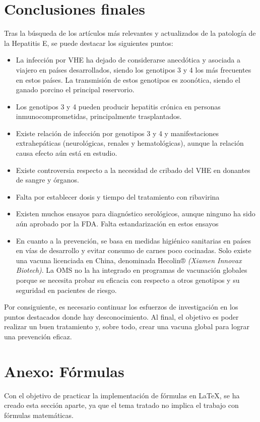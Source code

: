\documentclass[11 pt]{article}
\begin{document}
\section{Conclusiones finales}
Tras la búsqueda de los artículos más relevantes y actualizados de la patología de la Hepatitis E, se puede destacar los siguientes puntos:
\begin{itemize}
	\item 
	La infección por VHE ha dejado de considerarse anecdótica y asociada a viajero en países desarrollados, siendo los genotipos 3 y 4 los más frecuentes en estos países. La transmisión de estos genotipos es zoonótica, siendo el ganado porcino el principal reservorio. 
	\item 
	Los genotipos 3 y 4 pueden producir hepatitis crónica en personas inmunocomprometidas, principalmente trasplantados.
	\item 
	Existe relación de infección por genotipos 3 y 4 y manifestaciones extrahepáticas (neurológicas, renales y hematológicas), aunque la relación causa efecto aún está en estudio.
	\item 
	Existe controversia respecto a la necesidad de cribado del VHE en donantes de sangre y órganos.
	\item 
	Falta por establecer dosis y tiempo del tratamiento con ribavirina
	\item 
	Existen muchos ensayos para diagnóstico serológicos, aunque ninguno ha sido aún aprobado por la FDA. Falta estandarización en estos ensayos
	\item 
	En cuanto a la prevención, se basa en medidas higiénico sanitarias en países en vías de desarrollo y evitar consumo de carnes poco cocinadas. Solo existe una vacuna licenciada en China, denominada Hecolin® {\em (Xiamen Innovax Biotech)}. La OMS no la ha integrado en programas de vacunación globales porque se necesita probar su eficacia con respecto a otros genotipos y su seguridad en pacientes de riesgo.
\end{itemize}
Por consiguiente, es necesario continuar los esfuerzos de investigación en los puntos destacados donde hay desconocimiento. Al final, el objetivo es poder realizar un buen tratamiento y, sobre todo, crear una vacuna global para lograr una prevención eficaz.

\section{Anexo: Fórmulas}
Con el objetivo de practicar la implementación de fórmulas en LaTeX, se ha creado esta sección aparte, ya que el tema tratado no implica el trabajo con fórmulas matemáticas.\\\\



		
\end{document}
